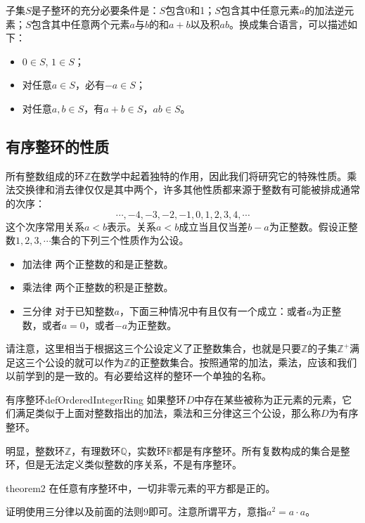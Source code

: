 子集$S$是子整环的充分必要条件是：$S$包含0和1；$S$包含其中任意元素$a$的加法逆元素；$S$包含其中任意两个元素$a$与$b$的和$a+b$以及积$ab$。换成集合语言，可以描述如下：
\begin{itemize}
\item $0 \in S$, $1 \in S$；
\item 对任意$a \in S$，必有$-a \in S$；
\item 对任意$a, b \in S$，有$a + b \in S$，$ab \in S$。
\end{itemize}

\subsection{有序整环的性质}
所有整数组成的环$\mathbb{Z}$在数学中起着独特的作用，因此我们将研究它的特殊性质。乘法交换律和消去律仅仅是其中两个，许多其他性质都来源于整数有可能被排成通常的次序：
\[
\cdots,-4,-3,-2,-1,0,1,2,3,4,\cdots
\]
这个次序常用关系$a<b$表示。关系$a<b$成立当且仅当差$b-a$为正整数。假设正整数$1,2,3,\cdots$集合的下列三个性质作为公设。
\begin{itemize}
\item 加法律 两个正整数的和是正整数。
\item 乘法律 两个正整数的积是正整数。
\item 三分律 对于已知整数$a$，下面三种情况中有且仅有一个成立：或者$a$为正整数，或者$a=0$，或者$-a$为正整数。
\end{itemize}

请注意，这里相当于根据这三个公设定义了正整数集合，也就是只要$\mathbb{Z}$的子集$\mathbb{Z}^+$满足这三个公设的就可以作为$\mathbb{Z}$的正整数集合。按照通常的加法，乘法，应该和我们以前学到的是一致的。有必要给这样的整环一个单独的名称。

\begin{definition}{有序整环}{defOrderedIntegerRing}
如果整环$D$中存在某些被称为正元素的元素，它们满足类似于上面对整数指出的加法，乘法和三分律这三个公设，那么称$D$为有序整环。
\end{definition}

明显，整数环$\mathbb{Z}$，有理数环$\mathbb{Q}$，实数环$\mathbb{R}$都是有序整环。所有复数构成的集合是整环，但是无法定义类似整数的序关系，不是有序整环。

\begin{theorem}{}{theorem2}
在任意有序整环中，一切非零元素的平方都是正的。
\end{theorem}

证明使用三分律以及前面的法则9即可。注意所谓平方，意指$a^2 = a \cdot a$。

